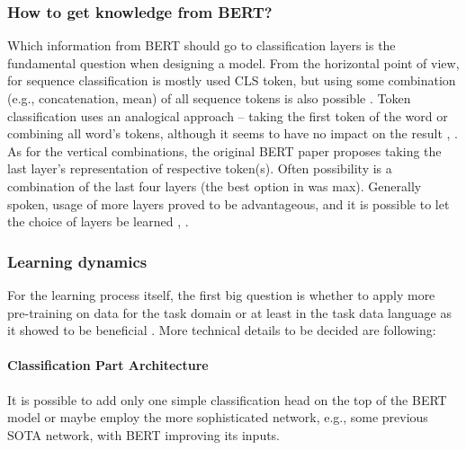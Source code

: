 \subsubsection{How to get knowledge from BERT?}
Which information from BERT should go to classification layers is the fundamental question when designing a model. From the horizontal point of view, for sequence classification is mostly used CLS token, but using some combination (e.g., concatenation, mean) of all sequence tokens is also possible \citep{Rogers2020}. Token classification uses an analogical approach -- taking the first token of the word or combining all word's tokens, although it seems to have no impact on the result \citep{Kondratyuk2019}, \citep{Kitaev2018}. As for the vertical combinations, the original BERT paper proposes taking the last layer's representation of respective token(s). Often possibility is a combination of the last four layers (the best option in \citep{Sun} was max). Generally spoken, usage of more layers proved to be advantageous, and it is possible to let the choice of layers be learned \citep{Yang2019b}, \citep{Kondratyuk2019}. %
\subsubsection{Learning dynamics}
For the learning process itself, the first big question is whether to apply more pre-training on data for the task domain or at least in the task data language as it showed to be beneficial \citep{Sun}. More technical details to be decided are following:

\paragraph{Classification Part Architecture} It is possible to add only one simple classification head on the top of the BERT model or maybe employ the more sophisticated network, e.g., some previous SOTA network, with BERT improving its inputs.
